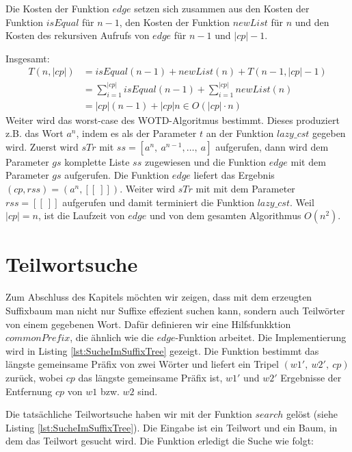 \documentclass[12pt]{report}
\newcommand{\abs}[1]{\left|#1\right|}
\begin{document}
Die Kosten der Funktion $edge$ setzen sich zusammen aus den Kosten der Funktion $isEqual$ für $n - 1$, den Kosten der Funktion $newList$ für $n$ und den Kosten des rekursiven Aufrufs von $edge$ für $n - 1$ und $\abs{cp} - 1$.

Insgesamt:
\begin{align*}
    T(n,\abs{cp}) &= isEqual(n - 1) + newList(n) + T(n-1,\abs{cp}-1) \\
                  &= \sum_{i = 1}^{\abs{cp}}{isEqual(n-1)} + \sum_{i = 1}^{\abs{cp}}{newList(n)}\\
                  &= \abs{cp} (n - 1) + \abs{cp} n \in O(\abs{cp} \cdot n)
\end{align*}
Weiter wird das worst-case des WOTD-Algoritmus bestimmt. Dieses produziert z.B. das Wort $a^n$, indem es als der Parameter $t$ an der Funktion $lazy\_cst$ gegeben wird. Zuerst wird $sTr$ mit $ss = [a^n,\:a^{n-1}, \dots ,\:a]$ aufgerufen, dann wird dem Parameter $gs$ komplette Liste $ss$ zugewiesen und die Funktion $edge$ mit dem Parameter $gs$ aufgerufen. Die Funktion $edge$ liefert das Ergebnis $(cp,rss) = (a^n, [[\:]])$. Weiter wird $sTr$ mit mit dem Parameter $rss = [[\:]]$ aufgerufen und damit terminiert die Funktion $lazy\_cst$. Weil $|cp| = n$, ist die Laufzeit von $edge$ und von dem gesamten Algorithmus $O(n^2)$.

\section{Teilwortsuche}
\label{sec:Teilwortsuche}

Zum Abschluss des Kapitels möchten wir zeigen, dass mit dem erzeugten Suffixbaum man nicht nur Suffixe effezient suchen kann, sondern auch Teilwörter von einem gegebenen Wort. Dafür definieren wir eine Hilfsfunkktion $commonPrefix$, die ähnlich wie die $edge$-Funktion arbeitet. Die Implementierung wird in Listing \ref{lst:SucheImSuffixTree} gezeigt. Die Funktion bestimmt das längste gemeinsame Präfix von zwei Wörter und liefert ein Tripel $(w1',\: w2',\: cp)$ zurück, wobei $cp$ das längste gemeinsame Präfix ist, $w1'$ und $w2'$ Ergebnisse der Entfernung $cp$ von $w1$ bzw. $w2$ sind.

Die tatsächliche Teilwortsuche haben wir mit der Funktion $search$ gelöst (siehe Listing \ref{lst:SucheImSuffixTree}). Die Eingabe ist ein Teilwort und ein Baum, in dem das Teilwort gesucht wird. Die Funktion erledigt die Suche wie folgt:
\end{document}
